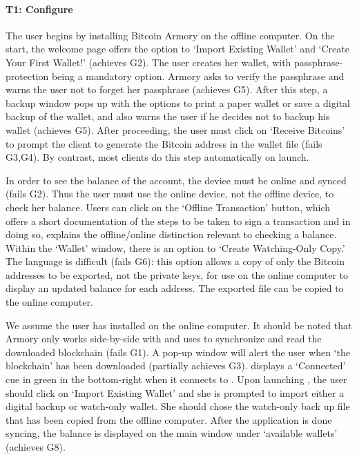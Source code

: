 \paragraph{T1: Configure} The user begins by installing Bitcoin Armory on the offline computer. On the start, the welcome page offers the option to `Import Existing Wallet' and `Create Your First Wallet!' (achieves G2). The user creates her wallet, with passphrase-protection being a mandatory option. Armory asks to verify the passphrase and warns the user not to forget her passphrase (achieves G5). After this step, a backup window pops up with the options to print a paper wallet or save a digital backup of the wallet, and also warns the user if he decides not to backup his wallet (achieves G5). After proceeding, the user must click on `Receive Bitcoins' to prompt the client to generate the Bitcoin address in the wallet file (fails G3,G4). By contrast, most clients do this step automatically on launch. 

In order to see the balance of the account, the device must be online and synced (fails G2). Thus the user must use the online device, not the offline device, to check her balance. Users can click on the `Offline Transaction' button, which offers a short documentation of the steps to be taken to sign a transaction and in doing so, explains the offline/online distinction relevant to checking a balance. Within the `Wallet' window, there is an option to `Create Watching-Only Copy.' The language is difficult (fails G6): this option allows a copy of only the Bitcoin addresses to be exported, not the private keys, for use on the online computer to display an updated balance for each address. The exported file can be copied to the online computer.

We assume the user has installed \armory on the online computer. It should be noted that Armory only works side-by-side with \Bitcoinclient and uses \Bitcoinclient to synchronize and read the downloaded blockchain (fails G1). A pop-up window will alert the user when `the blockchain'  has been downloaded (partially achieves G3). \armory displays a `Connected' cue in green in the bottom-right when it connects to \Bitcoinclient. Upon launching \armory, the user should click on `Import Existing Wallet' and she is prompted to import either a digital backup or watch-only wallet. She should chose the watch-only back up file that has been copied from the offline computer. After the application is done syncing, the balance is displayed on the main window under `available wallets' (achieves G8).

